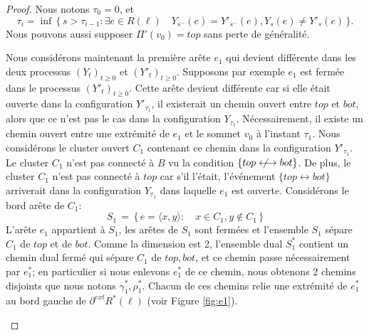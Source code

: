\documentclass[titlepage,a4paper,12pt]{article}
\newcounter{cor}
\newcommand{\nlongleftrightarrow}{\longleftrightarrow \kern-15pt\not \kern15pt}
\begin{document}
\begin{proof}
Nous notons $\tau_0 = 0$, et $$\tau_i = \inf \, \big\{\,s > \tau_{i-1}: \exists e \in R(\ell)\quad Y_{s^-}(e) = Y'_{s^-}(e),Y_s(e) \neq Y'_s(e)\,\big\}.$$ Nous pouvons aussi supposer $\Pi'(v_0)=top$ sans perte de généralité. 

Nous considérons maintenant la première arête $e_1$ qui devient différente dans les deux processus $(Y_t)_{t\geqslant 0}$ et $(Y'_t)_{t\geqslant 0}$. Supposons par exemple $e_1$ est fermée dans le processus $(Y'_t)_{t\geqslant 0}$. Cette arête devient différente car si elle était ouverte dans la configuration $Y'_{\tau_1}$, il existerait un chemin ouvert entre $top$ et $bot$, alors que ce n'est pas le cas dans la configuration $Y_{\tau_1}$. Nécessairement, il existe un chemin ouvert entre une extrémité de $e_1$ et le sommet $v_0$ à l'instant $\tau_1$. Nous considérons le cluster ouvert $C_1$ contenant ce chemin dans la configuration $Y'_{\tau_1}$. Le cluster $C_1$ n'est pas connecté à $B$ vu la condition $\{top\nlongleftrightarrow bot\}$. De plus, le cluster $C_1$ n'est pas connecté à $top$ car s'il l'était, l'événement $\{top\longleftrightarrow bot\}$ arriverait dans la configuration $Y_{\tau_1}$ dans laquelle $e_1$ est ouverte. Considérons le bord arête de $C_1$:
$$ S_1 \,=\, \big\{\, e = \langle x,y\rangle :\quad x\in C_1, y\notin C_1\,\big\}
$$
L'arête $e_1$ appartient à $S_1$, les arêtes de $S_1$ sont fermées et l'ensemble $S_1$ sépare $C_1$ de $top$ et de $bot$. Comme la dimension est 2, l'ensemble dual $S_1^*$ contient un chemin dual fermé qui sépare $C_1$ de $top,bot$, et ce chemin passe nécessairement par $e_1^*$; en particulier si nous enlevons $e_1^*$ de ce chemin, nous obtenons 2 chemins disjoints que nous notons $\gamma_1^*, \rho_1^*$. Chacun de ces chemins relie une extrémité de $e_1^*$ au bord gauche de $\partial^{ext}R^*(\ell)$ (voir Figure \ref{fig:e1}). 
\begin{figure}[h]
\begin{minipage}{0.45\linewidth}
\center
{}
\end{minipage}
\end{figure}
\end{proof}
\end{document}

